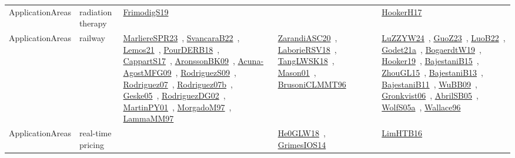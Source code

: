 {\begin{longtable}{lp{3cm}>{\raggedright\arraybackslash}p{6cm}>{\raggedright\arraybackslash}p{6cm}>{\raggedright\arraybackslash}p{8cm}}
ApplicationAreas & radiation therapy & \href{../works/FrimodigS19.pdf}{FrimodigS19}~\cite{FrimodigS19} &  & \href{../works/HookerH17.pdf}{HookerH17}~\cite{HookerH17}\\
ApplicationAreas & railway & \href{../works/MarliereSPR23.pdf}{MarliereSPR23}~\cite{MarliereSPR23}, \href{../works/SvancaraB22.pdf}{SvancaraB22}~\cite{SvancaraB22}, \href{../works/Lemos21.pdf}{Lemos21}~\cite{Lemos21}, \href{../works/PourDERB18.pdf}{PourDERB18}~\cite{PourDERB18}, \href{../works/CappartS17.pdf}{CappartS17}~\cite{CappartS17}, \href{../works/AronssonBK09.pdf}{AronssonBK09}~\cite{AronssonBK09}, \href{../works/Acuna-AgostMFG09.pdf}{Acuna-AgostMFG09}~\cite{Acuna-AgostMFG09}, \href{../works/RodriguezS09.pdf}{RodriguezS09}~\cite{RodriguezS09}, \href{../works/Rodriguez07.pdf}{Rodriguez07}~\cite{Rodriguez07}, \href{../works/Rodriguez07b.pdf}{Rodriguez07b}~\cite{Rodriguez07b}, \href{../works/Geske05.pdf}{Geske05}~\cite{Geske05}, \href{../works/RodriguezDG02.pdf}{RodriguezDG02}~\cite{RodriguezDG02}, \href{../works/MartinPY01.pdf}{MartinPY01}~\cite{MartinPY01}, \href{../works/MorgadoM97.pdf}{MorgadoM97}~\cite{MorgadoM97}, \href{../works/LammaMM97.pdf}{LammaMM97}~\cite{LammaMM97} & \href{../works/ZarandiASC20.pdf}{ZarandiASC20}~\cite{ZarandiASC20}, \href{../works/LaborieRSV18.pdf}{LaborieRSV18}~\cite{LaborieRSV18}, \href{../works/TangLWSK18.pdf}{TangLWSK18}~\cite{TangLWSK18}, \href{../works/Mason01.pdf}{Mason01}~\cite{Mason01}, \href{../works/BrusoniCLMMT96.pdf}{BrusoniCLMMT96}~\cite{BrusoniCLMMT96} & \href{../works/LuZZYW24.pdf}{LuZZYW24}~\cite{LuZZYW24}, \href{../works/GuoZ23.pdf}{GuoZ23}~\cite{GuoZ23}, \href{../works/LuoB22.pdf}{LuoB22}~\cite{LuoB22}, \href{../works/Godet21a.pdf}{Godet21a}~\cite{Godet21a}, \href{../works/BogaerdtW19.pdf}{BogaerdtW19}~\cite{BogaerdtW19}, \href{../works/Hooker19.pdf}{Hooker19}~\cite{Hooker19}, \href{../works/BajestaniB15.pdf}{BajestaniB15}~\cite{BajestaniB15}, \href{../works/ZhouGL15.pdf}{ZhouGL15}~\cite{ZhouGL15}, \href{../works/BajestaniB13.pdf}{BajestaniB13}~\cite{BajestaniB13}, \href{../works/BajestaniB11.pdf}{BajestaniB11}~\cite{BajestaniB11}, \href{../works/WuBB09.pdf}{WuBB09}~\cite{WuBB09}, \href{../works/Gronkvist06.pdf}{Gronkvist06}~\cite{Gronkvist06}, \href{../works/AbrilSB05.pdf}{AbrilSB05}~\cite{AbrilSB05}, \href{../works/WolfS05a.pdf}{WolfS05a}~\cite{WolfS05a}, \href{../works/Wallace96.pdf}{Wallace96}~\cite{Wallace96}\\
ApplicationAreas & real-time pricing &  & \href{../works/He0GLW18.pdf}{He0GLW18}~\cite{He0GLW18}, \href{../works/GrimesIOS14.pdf}{GrimesIOS14}~\cite{GrimesIOS14} & \href{../works/LimHTB16.pdf}{LimHTB16}~\cite{LimHTB16}\\

\end{longtable}}
